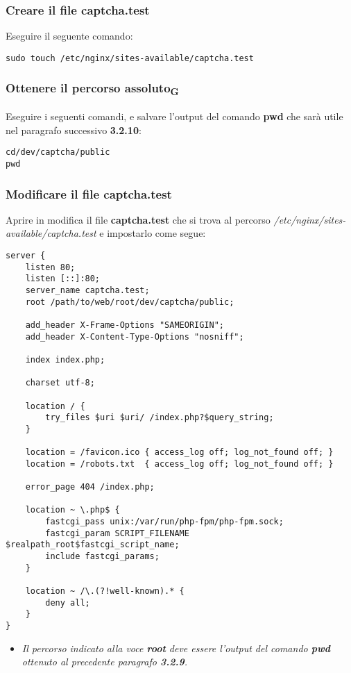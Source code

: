 \subsubsection{Creare il file captcha.test}
Eseguire il seguente comando:
\begin{verbatim}
sudo touch /etc/nginx/sites-available/captcha.test 
\end{verbatim}

\subsubsection{Ottenere il percorso assoluto\textsubscript{G}}
Eseguire i seguenti comandi, e salvare l'output del comando \textbf{pwd} che sarà utile nel paragrafo successivo \textbf{3.2.10}:
\begin{verbatim}
cd/dev/captcha/public
pwd
\end{verbatim}

\subsubsection{Modificare il file captcha.test}
Aprire in modifica il file \textbf{captcha.test} che si trova al percorso \textit{/etc/nginx/sites-available/captcha.test } e impostarlo come segue:
\begin{verbatim}
server {
    listen 80;
    listen [::]:80;
    server_name captcha.test;
    root /path/to/web/root/dev/captcha/public;
 
    add_header X-Frame-Options "SAMEORIGIN";
    add_header X-Content-Type-Options "nosniff";
 
    index index.php;
 
    charset utf-8;
 
    location / {
        try_files $uri $uri/ /index.php?$query_string;
    }
 
    location = /favicon.ico { access_log off; log_not_found off; }
    location = /robots.txt  { access_log off; log_not_found off; }
 
    error_page 404 /index.php;
 
    location ~ \.php$ {
        fastcgi_pass unix:/var/run/php-fpm/php-fpm.sock;
        fastcgi_param SCRIPT_FILENAME $realpath_root$fastcgi_script_name;
        include fastcgi_params;
    }
 
    location ~ /\.(?!well-known).* {
        deny all;
    }
}
\end{verbatim}

\begin{itemize}
	\item \textit{Il percorso indicato alla voce \textbf{root} deve essere l'output del comando \textbf{pwd} ottenuto al precedente paragrafo \textbf{3.2.9}.} 
\end{itemize} 


